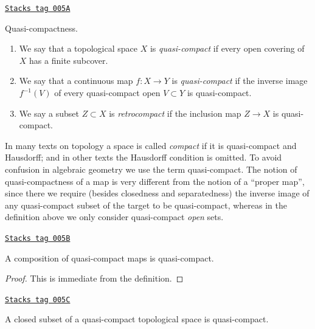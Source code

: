 \begin{definition}
\label{topology-definition-quasi-compact}
\href{https://stacks.math.columbia.edu/tag/005A}{\texttt{Stacks tag 005A}}

Quasi-compactness.
\begin{enumerate}
\item We say that a topological space $X$ is {\it quasi-compact}
if every open covering of $X$ has a finite subcover.
\item We say that a continuous map $f : X \to Y$ is {\it quasi-compact}
if the inverse image $f^{-1}(V)$ of every quasi-compact open $V \subset Y$
is quasi-compact.
\item We say a subset $Z \subset X$ is {\it retrocompact}
if the inclusion map $Z \to X$ is quasi-compact.
\end{enumerate}
\end{definition}

In many texts on topology a space is called {\it compact} if it
is quasi-compact and Hausdorff; and in other texts the Hausdorff
condition is omitted. To avoid confusion in algebraic geometry
we use the term quasi-compact. The notion of quasi-compactness
of a map is very different from the notion of a ``proper map'',
since there we require (besides closedness and separatedness)
the inverse image of any quasi-compact subset of the target to be
quasi-compact, whereas in the definition above we only consider
quasi-compact {\it open} sets.

\begin{lemma}
\label{topology-lemma-composition-quasi-compact}
\href{https://stacks.math.columbia.edu/tag/005B}{\texttt{Stacks tag 005B}}

A composition of quasi-compact maps is quasi-compact.
\end{lemma}

\begin{proof}
This is immediate from the definition.
\end{proof}

\begin{lemma}
\label{topology-lemma-closed-in-quasi-compact}
\href{https://stacks.math.columbia.edu/tag/005C}{\texttt{Stacks tag 005C}}

A closed subset of a quasi-compact topological space is quasi-compact.
\end{lemma}

